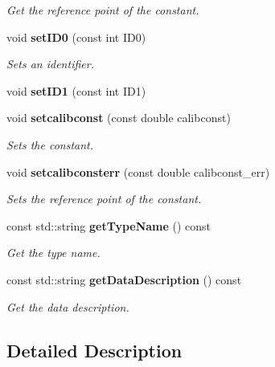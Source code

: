 \begin{DoxyCompactItemize}
\begin{DoxyCompactList}\small\item\em Get the reference point of the constant. \end{DoxyCompactList}\item 
void {\bf set\-I\-D0} (const int I\-D0)\label{classCALICE_1_1ScECALIntercalib_a27c71e4bf4c6276ba3092315c3603f7b}

\begin{DoxyCompactList}\small\item\em Sets an identifier. \end{DoxyCompactList}\item 
void {\bfseries set\-I\-D1} (const int I\-D1)\label{classCALICE_1_1ScECALIntercalib_a33d8428f552820b934ffdc86573ca8fb}

\item 
void {\bf setcalibconst} (const double calibconst)\label{classCALICE_1_1ScECALIntercalib_a07fad799282b16463c2c9d1734b19d0d}

\begin{DoxyCompactList}\small\item\em Sets the constant. \end{DoxyCompactList}\item 
void {\bf setcalibconsterr} (const double calibconst\-\_\-err)\label{classCALICE_1_1ScECALIntercalib_aa6ebb33f0fe837427dda7b58b3f4554e}

\begin{DoxyCompactList}\small\item\em Sets the reference point of the constant. \end{DoxyCompactList}\item 
const std\-::string {\bf get\-Type\-Name} () const 
\begin{DoxyCompactList}\small\item\em Get the type name. \end{DoxyCompactList}\item 
const std\-::string {\bf get\-Data\-Description} () const 
\begin{DoxyCompactList}\small\item\em Get the data description. \end{DoxyCompactList}\end{DoxyCompactItemize}


\subsection{Detailed Description}


